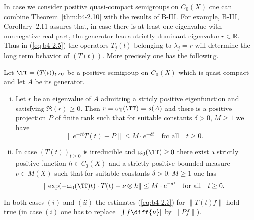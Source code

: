 In case we consider positive quasi-compact semigroups on $C_{0}(X)$ one can combine Theorem~\ref{thm:b4-2.10} with the results of B-III. For example, B-III, Corollary~2.11 assures that, in case there is at least one eigenvalue with nonnegative real part, the generator has a strictly dominant eigenvalue $r \in \mathbb{R}$. Thus in (\ref{eq:b4-2.5}) the operators $T_j(t)$ belonging to $\lambda_j = r$ will determine the long term behavior of $(T(t))$. More precisely one has the following.
\begin{corollary}\label{cor:b4-2.11}
	Let $\TT = (T(t))_{t \geq 0}$ be a positive semigroup on $C_{0}(X)$ which is quasi-compact and let $A$ be its generator.
	\begin{enumerate}[(i)]
	\item	
	Let $r$ be an eigenvalue of $A$ admitting a stricly positive eigenfunction and satisfying $\Re(r) \geq 0$. Then $r = \omega_{0}(\TT) = s(A)$ and there is a positive projection $P$ of finite rank such that for
%
%
%
\newpage 
%
	suitable constants $\delta > 0$, $M \geq 1$ we have
	\begin{equation}\label{eq:b4-2.6}
		\|e^{-rt}T(t) - P\| \leq M \cdot e^{-\delta t} \quad \text{for all} \quad t \geq 0 \text{.}
	\end{equation}
	
	\item 
	In case $(T(t))_{t \geq 0}$ is irreducible and $\omega_{0}(\TT) \geq 0$ there exist a strictly positive function $h \in C_{0}(X)$ and a strictly positive bounded measure $\nu \in M(X)$ such that for suitable constants $\delta > 0$, $M \geq 1$ one has
	\begin{equation}\label{eq:b4-2.7}
		\|\exp(-\omega_{0}(\TT)t) \cdot T(t) - \nu \otimes h\| \leq M \cdot e^{-\delta t} \quad \text{for all} \quad t \geq 0 \text{.}
	\end{equation}
	\end{enumerate}
In both cases $(i)$ and $(ii)$ the estimates (\ref{eq:b4-2.3}) for $\|T(t)f\|$ hold true (in case $(i)$ one has to replace $|\int f \diff{\nu}|$ by $\|Pf\|$).
\end{corollary}
